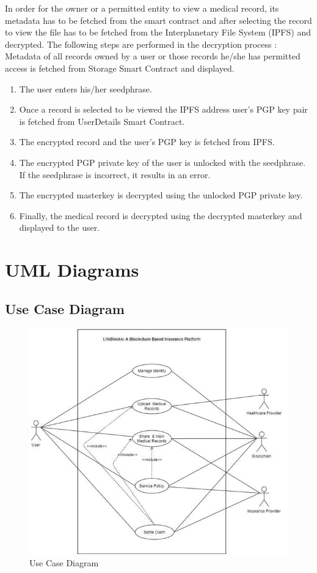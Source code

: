 In order for the owner or a permitted entity to view a medical record, its metadata has to be fetched from the smart contract and after selecting the record to view the file has to be fetched from the Interplanetary File System (IPFS) and decrypted. The following steps are performed in the decryption process :
Metadata of all records owned by a user or those records he/she has permitted access is fetched from Storage Smart Contract and displayed.
\\
\begin{enumerate}
    \item The user enters his/her seedphrase.
    \item Once a record is selected to be viewed the IPFS address user’s PGP key pair is fetched from UserDetails Smart Contract.
    \item The encrypted record and the user’s PGP key is fetched from IPFS.
    \item The encrypted PGP private key of the user is unlocked with the seedphrase. If the seedphrase is incorrect, it results in an error.
    \item The encrypted masterkey is decrypted using the unlocked PGP private key.
    \item Finally, the medical record is decrypted using the decrypted masterkey and displayed to the user.  
\end{enumerate}


\clearpage
\section{UML Diagrams}
\subsection{Use Case Diagram}
\begin{figure}[h!]
	\centering
	\includegraphics[width=\linewidth]{Images/Usecase.jpg}
	\caption{Use Case Diagram}
\end{figure}

